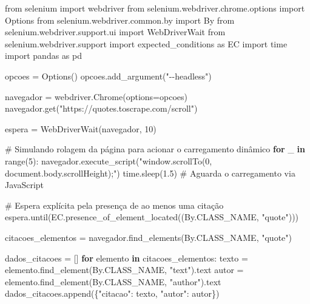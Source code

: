 \documentclass[
  brazilian,
  letterpaper,
  DIV=11,
  numbers=noendperiod]{scrreprt}
\newenvironment{Shaded}{\begin{snugshade}}{\end{snugshade}}
\newcommand{\BuiltInTok}[1]{\textcolor[rgb]{0.00,0.23,0.31}{#1}}
\newcommand{\CommentTok}[1]{\textcolor[rgb]{0.37,0.37,0.37}{#1}}
\newcommand{\ControlFlowTok}[1]{\textcolor[rgb]{0.00,0.23,0.31}{\textbf{#1}}}
\newcommand{\DecValTok}[1]{\textcolor[rgb]{0.68,0.00,0.00}{#1}}
\newcommand{\FloatTok}[1]{\textcolor[rgb]{0.68,0.00,0.00}{#1}}
\newcommand{\ImportTok}[1]{\textcolor[rgb]{0.00,0.46,0.62}{#1}}
\newcommand{\KeywordTok}[1]{\textcolor[rgb]{0.00,0.23,0.31}{\textbf{#1}}}
\newcommand{\NormalTok}[1]{\textcolor[rgb]{0.00,0.23,0.31}{#1}}
\newcommand{\OperatorTok}[1]{\textcolor[rgb]{0.37,0.37,0.37}{#1}}
\newcommand{\StringTok}[1]{\textcolor[rgb]{0.13,0.47,0.30}{#1}}
\begin{document}
\begin{Shaded}
\begin{Highlighting}[]
\ImportTok{from}\NormalTok{ selenium }\ImportTok{import}\NormalTok{ webdriver}
\ImportTok{from}\NormalTok{ selenium.webdriver.chrome.options }\ImportTok{import}\NormalTok{ Options}
\ImportTok{from}\NormalTok{ selenium.webdriver.common.by }\ImportTok{import}\NormalTok{ By}
\ImportTok{from}\NormalTok{ selenium.webdriver.support.ui }\ImportTok{import}\NormalTok{ WebDriverWait}
\ImportTok{from}\NormalTok{ selenium.webdriver.support }\ImportTok{import}\NormalTok{ expected\_conditions }\ImportTok{as}\NormalTok{ EC}
\ImportTok{import}\NormalTok{ time}
\ImportTok{import}\NormalTok{ pandas }\ImportTok{as}\NormalTok{ pd}

\NormalTok{opcoes }\OperatorTok{=}\NormalTok{ Options()}
\NormalTok{opcoes.add\_argument(}\StringTok{"{-}{-}headless"}\NormalTok{)}

\NormalTok{navegador }\OperatorTok{=}\NormalTok{ webdriver.Chrome(options}\OperatorTok{=}\NormalTok{opcoes)}
\NormalTok{navegador.get(}\StringTok{"https://quotes.toscrape.com/scroll"}\NormalTok{)}

\NormalTok{espera }\OperatorTok{=}\NormalTok{ WebDriverWait(navegador, }\DecValTok{10}\NormalTok{)}

\CommentTok{\# Simulando rolagem da página para acionar o carregamento dinâmico}
\ControlFlowTok{for}\NormalTok{ \_ }\KeywordTok{in} \BuiltInTok{range}\NormalTok{(}\DecValTok{5}\NormalTok{):}
\NormalTok{    navegador.execute\_script(}\StringTok{"window.scrollTo(0, document.body.scrollHeight);"}\NormalTok{)}
\NormalTok{    time.sleep(}\FloatTok{1.5}\NormalTok{)  }\CommentTok{\# Aguarda o carregamento via JavaScript}

\CommentTok{\# Espera explícita pela presença de ao menos uma citação}
\NormalTok{espera.until(EC.presence\_of\_element\_located((By.CLASS\_NAME, }\StringTok{"quote"}\NormalTok{)))}

\NormalTok{citacoes\_elementos }\OperatorTok{=}\NormalTok{ navegador.find\_elements(By.CLASS\_NAME, }\StringTok{"quote"}\NormalTok{)}

\NormalTok{dados\_citacoes }\OperatorTok{=}\NormalTok{ []}
\ControlFlowTok{for}\NormalTok{ elemento }\KeywordTok{in}\NormalTok{ citacoes\_elementos:}
\NormalTok{    texto }\OperatorTok{=}\NormalTok{ elemento.find\_element(By.CLASS\_NAME, }\StringTok{"text"}\NormalTok{).text}
\NormalTok{    autor }\OperatorTok{=}\NormalTok{ elemento.find\_element(By.CLASS\_NAME, }\StringTok{"author"}\NormalTok{).text}
\NormalTok{    dados\_citacoes.append(\{}\StringTok{"citacao"}\NormalTok{: texto, }\StringTok{"autor"}\NormalTok{: autor\})}


\end{Highlighting}
\end{Shaded}
\end{document}
